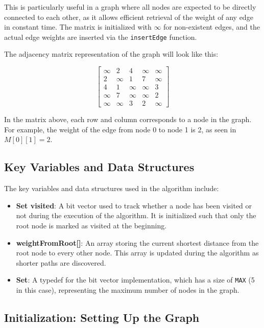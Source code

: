 \documentclass{book}
\begin{document}
This is particularly useful in a graph where all nodes are expected to be directly connected to each other, as it allows efficient retrieval of the weight of any edge in constant time. The matrix is initialized with \(\infty\) for non-existent edges, and the actual edge weights are inserted via the \texttt{insertEdge} function.

The adjacency matrix representation of the graph will look like this:

\[
\begin{bmatrix}
\infty & 2 & 4 & \infty & \infty \\
2 & \infty & 1 & 7 & \infty \\
4 & 1 & \infty & \infty & 3 \\
\infty & 7 & \infty & \infty & 2 \\
\infty & \infty & 3 & 2 & \infty
\end{bmatrix}
\]

In the matrix above, each row and column corresponds to a node in the graph. For example, the weight of the edge from node 0 to node 1 is 2, as seen in \( M[0][1] = 2 \).

\subsection{Key Variables and Data Structures}

The key variables and data structures used in the algorithm include:

\begin{itemize}
    \item \textbf{Set visited}: A bit vector used to track whether a node has been visited or not during the execution of the algorithm. It is initialized such that only the root node is marked as visited at the beginning.
    \item \textbf{weightFromRoot[]}: An array storing the current shortest distance from the root node to every other node. This array is updated during the algorithm as shorter paths are discovered.
    \item \textbf{Set}: A typedef for the bit vector implementation, which has a size of \texttt{MAX} (5 in this case), representing the maximum number of nodes in the graph.
\end{itemize}

\subsection{Initialization: Setting Up the Graph}
\end{document}
